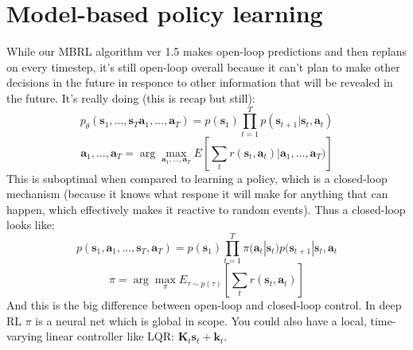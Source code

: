 \documentclass{report}
\newcommand{\argmax}{\arg\!\max}
\begin{document}
\chapter{Model-based policy learning}
While our MBRL algorithm ver 1.5 makes open-loop predictions and then replans on every timestep, 
it's still open-loop overall because it can't plan to make other decisions in the future in responce to other information 
that will be revealed in the future.
It's really doing (this is recap but still):
\begin{equation}
		p_\theta ( \bm{s}_{1}, \dots , \bm{s}_{T} \bm{a}_{1}, \dots , \bm{a}_{T}) =
		p(\bm{s}_{1}) \prod_{t=1}^{T} p(\bm{s}_{t+1} | \bm{s}_{t}, \bm{a}_{t}) 
\end{equation}
\begin{equation}
		\bm{a}_{1}, \dots , \bm{a}_{T} = \argmax_{\bm{a}_{1}, \dots , \bm{a}_{T}} E \left[ 
		\sum_{t}^{} r (\bm{s}_{t}, \bm{a}_{t} )| \bm{a}_{1}, \dots , \bm{a}_{T})\right] 
\end{equation}
This is suboptimal when compared to learning a policy, which is a closed-loop mechanism (because it knows
what respone it will make for anything that can happen, which effectively makes it reactive to random events).
Thus a closed-loop looks like:
\begin{equation}
		p(\bm{s}_{1}, \bm{a}_{1}, \dots, \bm{s}_{T}, \bm{a}_{T}) =
		p(\bm{s}_{1}) \prod_{t=1}^{T} \pi(\bm{a}_{t}| \bm{s}_{t}) p(\bm{s}_{t+1}| \bm{s}_{t}, \bm{a}_{t} 
\end{equation}
\begin{equation}
		\pi = \argmax_\pi E_{\tau \sim p(\tau)} \left[ \sum_{t}^{} r (\bm{s}_{t}, \bm{a}_{t} ) \right] 
\end{equation}
And this is the big difference between open-loop and closed-loop control.
In deep RL $\pi$ is a neural net which is global in scope.
You could also have a local, time-varying linear controller like LQR: $\bm{K}_{t}\bm{s}_{t} + \bm{k}_{t}$.
\end{document}
